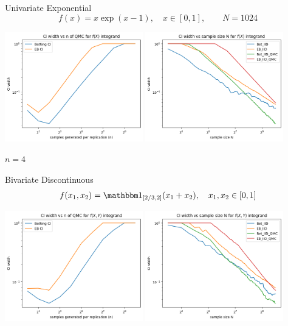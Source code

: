 \documentclass[11pt,compress,xcolor={usenames,dvipsnames},aspectratio=169]{beamer}
\begin{document}
\begin{frame}{Univariate Exponential}
\vspace{-7ex}
\[
f(x) = x\exp(x-1), \quad x \in [0,1], \qquad N = 1024
\]
\centerline{\includegraphics[width=0.45\textwidth]{Figures/f(x).png}
\quad
\includegraphics[width=0.45\textwidth]{Figures/f(x)_opt_n.png}} 

\vspace{-3ex}
\hspace{0.72\textwidth}$n=4$
    
\end{frame}

\begin{frame}{Bivariate Discontinuous}
\vspace{-7ex}
\[
f(x_1,x_2) = \bbone_{[2/3,2]}(x_1+x_2), \quad x_1,x_2 \in [0,1]
\]
\centerline{\includegraphics[width=0.45\textwidth]{Figures/f(x,y).png}
\quad
\includegraphics[width=0.45\textwidth]{Figures/f(x,y)_opt_n.png}} 
    
\end{frame}
\end{document}
